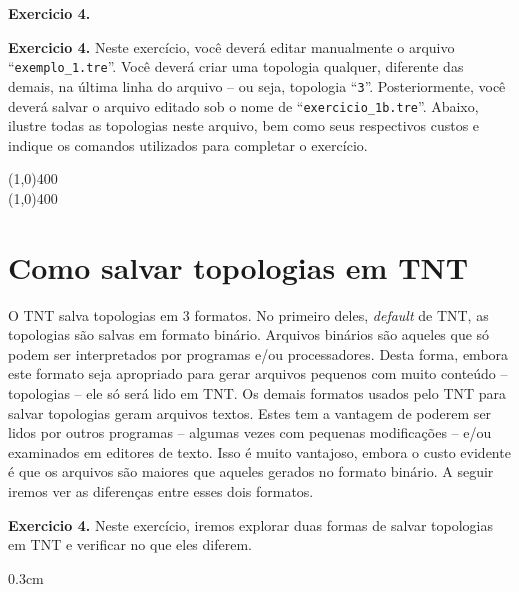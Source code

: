 \begin{refsection}
\begin{blackBlock}{\textbf{Exercicio 4.}}
\end{blackBlock}

\begin{blackBlock}{\textbf{Exercicio 4.}}\label{tut4:ex:4.5}
	Neste exercício, você deverá editar manualmente o arquivo ``\texttt{exemplo\_1.tre}''. Você deverá criar uma topologia qualquer, diferente das demais, na última linha do arquivo -- ou seja, topologia ``\texttt{3}''. Posteriormente, você deverá salvar o arquivo editado sob o nome de ``\texttt{exercicio\_1b.tre}''. Abaixo, ilustre todas as topologias neste arquivo, bem como seus respectivos custos e indique os comandos utilizados para completar o exercício. 

\vspace{120pt}

 \begin{center}
  \line(1,0){400}\\
  \line(1,0){400}\\
 \end{center}

\end{blackBlock}


\section{Como salvar topologias em TNT}\label{tut4:tsave}
O TNT salva topologias em 3 formatos. No primeiro deles, \textit{default} de TNT, as topologias são salvas em formato binário. Arquivos binários são aqueles que só podem ser interpretados por programas e/ou processadores. Desta forma, embora este formato seja apropriado para gerar arquivos pequenos com muito conteúdo -- topologias -- ele só será lido em TNT. Os demais formatos usados pelo TNT para salvar topologias geram arquivos textos. Estes tem a vantagem de poderem ser lidos por outros programas -- algumas vezes com pequenas modificações -- e/ou examinados em editores de texto. Isso é muito vantajoso, embora o custo evidente é que os arquivos são maiores que aqueles gerados no formato binário. A seguir iremos ver as diferenças entre esses dois formatos.\\

\begin{blackBlock}{\textbf{Exercicio 4.}}\label{tut4:ex:4.6}
	Neste exercício, iremos explorar duas formas de salvar topologias em TNT e verificar no que eles diferem.

\begin {myindentpar}{0.3cm}
\begin{enumerate}[\itshape i.]


\end{enumerate}
\end{myindentpar}
\end{blackBlock}
\end{refsection}
